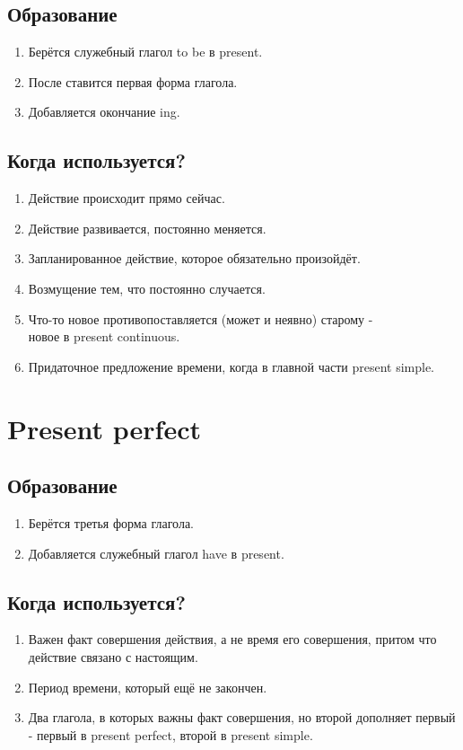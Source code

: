\documentclass[oneside]{book}
\begin{document}
\subsection{Образование}
\begin{enumerate}
    \item Берётся служебный глагол to be в present.
    \item После ставится первая форма глагола.
    \item Добавляется окончание ing.
\end{enumerate}

\subsection{Когда используется?}
\begin{enumerate}
    \item Действие происходит прямо сейчас.

    \item Действие развивается, постоянно меняется.

    \item Запланированное действие, которое обязательно произойдёт.

    \item Возмущение тем, что постоянно случается.

    \item Что-то новое противопоставляется (может и неявно) старому - \\
    новое в present continuous.

    \item Придаточное предложение времени, когда в главной части present simple.
\end{enumerate}

\section{Present perfect}
\subsection{Образование}
\begin{enumerate}
    \item Берётся третья форма глагола.
    \item Добавляется служебный глагол have в present.
\end{enumerate}

\subsection{Когда используется?}
\begin{enumerate}
    \item Важен факт совершения действия,
    а не время его совершения, притом что действие связано с настоящим.

    \item Период времени, который ещё не закончен.

    \item Два глагола, в которых важны факт совершения, но второй дополняет первый -
    первый в present perfect, второй в present simple.
\end{enumerate}
\end{document}
